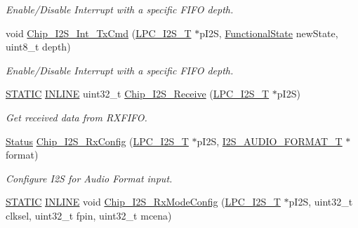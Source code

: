 \begin{DoxyCompactItemize}
\begin{DoxyCompactList}\small\item\em Enable/\+Disable Interrupt with a specific F\+I\+FO depth. \end{DoxyCompactList}\item 
void \hyperlink{group__I2S__17XX__40XX_gaf5ea5a92372f64937b2a967f8aa284f3}{Chip\+\_\+\+I2\+S\+\_\+\+Int\+\_\+\+Tx\+Cmd} (\hyperlink{structLPC__I2S__T}{L\+P\+C\+\_\+\+I2\+S\+\_\+T} $\ast$p\+I2S, \hyperlink{group__LPC__Types__Public__Types_gac9a7e9a35d2513ec15c3b537aaa4fba1}{Functional\+State} new\+State, uint8\+\_\+t depth)
\begin{DoxyCompactList}\small\item\em Enable/\+Disable Interrupt with a specific F\+I\+FO depth. \end{DoxyCompactList}\item 
\hyperlink{group__LPC__Types__Public__Macros_ga10b2d890d871e1489bb02b7e70d9bdfb}{S\+T\+A\+T\+IC} \hyperlink{group__LPC__Types__Public__Types_ga2eb6f9e0395b47b8d5e3eeae4fe0c116}{I\+N\+L\+I\+NE} uint32\+\_\+t \hyperlink{group__I2S__17XX__40XX_ga74005245ee6b79220df6a563db92a04f}{Chip\+\_\+\+I2\+S\+\_\+\+Receive} (\hyperlink{structLPC__I2S__T}{L\+P\+C\+\_\+\+I2\+S\+\_\+T} $\ast$p\+I2S)
\begin{DoxyCompactList}\small\item\em Get received data from R\+X\+F\+I\+FO. \end{DoxyCompactList}\item 
\hyperlink{group__LPC__Types__Public__Types_ga67a0db04d321a74b7e7fcfd3f1a3f70b}{Status} \hyperlink{group__I2S__17XX__40XX_gab443fc12cad5f6cfb13dc5ab19a003ae}{Chip\+\_\+\+I2\+S\+\_\+\+Rx\+Config} (\hyperlink{structLPC__I2S__T}{L\+P\+C\+\_\+\+I2\+S\+\_\+T} $\ast$p\+I2S, \hyperlink{structI2S__AUDIO__FORMAT__T}{I2\+S\+\_\+\+A\+U\+D\+I\+O\+\_\+\+F\+O\+R\+M\+A\+T\+\_\+T} $\ast$format)
\begin{DoxyCompactList}\small\item\em Configure I2S for Audio Format input. \end{DoxyCompactList}\item 
\hyperlink{group__LPC__Types__Public__Macros_ga10b2d890d871e1489bb02b7e70d9bdfb}{S\+T\+A\+T\+IC} \hyperlink{group__LPC__Types__Public__Types_ga2eb6f9e0395b47b8d5e3eeae4fe0c116}{I\+N\+L\+I\+NE} void \hyperlink{group__I2S__17XX__40XX_gae4e5e39c6ea22b2be42c91bdaa0f27e8}{Chip\+\_\+\+I2\+S\+\_\+\+Rx\+Mode\+Config} (\hyperlink{structLPC__I2S__T}{L\+P\+C\+\_\+\+I2\+S\+\_\+T} $\ast$p\+I2S, uint32\+\_\+t clksel, uint32\+\_\+t fpin, uint32\+\_\+t mcena)

\end{DoxyCompactItemize}
